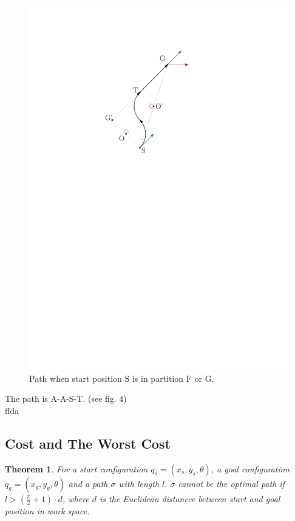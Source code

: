 \documentclass[12pt]{article}
\newtheorem{theorem}{Theorem}[section]
\begin{document}
  \begin{figure}
  \centering
  \includegraphics[scale=1]{Diff_Drive_Gene_Case_1}
  \caption{Path when start position S is in partition F or G.}
  \end{figure}
  
  The path is A-A-S-T. (see fig. 4)\\
  ffda
  \subsection{Cost and The Worst Cost}

  \begin{theorem}
  	For a start configuration $q_{s} = (x_{s},y_{s},\theta)$, a goal configuration $q_{g} = (x_{g},y_{g},\theta)$ and a path $\sigma$ with length $l$. $\sigma$ cannot be the optimal path if $l > (\frac{\pi}{2} + 1) \cdot d$, where $d$ is the Euclidean distancce between start and goal position in work space.
  \end{theorem}
\end{document}
